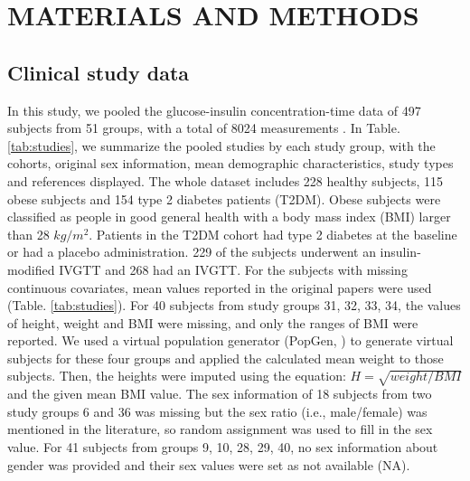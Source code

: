 \documentclass[utf8]{frontiersSCNS} %
\begin{document}
\section{MATERIALS AND METHODS}

\subsection{Clinical study data}
In this study, we pooled the glucose-insulin concentration-time data of 497 subjects from 51 groups, with a total of 8024 measurements . In Table. \ref{tab:studies}, we summarize the pooled studies by each study group, with the cohorts, original sex information, mean demographic characteristics, study types and references displayed. The whole dataset includes 228 healthy subjects, 115 obese subjects and 154 type 2 diabetes patients (T2DM). Obese subjects were classified as people in good general health with a body mass index (BMI) larger than 28 $kg/m^2$. Patients in the T2DM cohort had type 2 diabetes at the baseline or had a placebo administration. 229 of the subjects underwent an insulin-modified IVGTT and 268 had an IVGTT. For the subjects with missing continuous covariates, mean values reported in the original papers were used (Table. \ref{tab:studies}). For 40 subjects from study groups 31, 32, 33, 34, the values of height, weight and BMI were missing, and only the ranges of BMI were reported. We used a virtual population generator (PopGen, \cite{McNally2015}) to generate virtual subjects for these four groups and applied the calculated mean weight to those subjects. Then, the heights were imputed using the equation: $H=\sqrt{weight/BMI}$ and the given mean BMI value. The sex information of 18 subjects from two study groups 6 and 36 was missing but the sex ratio (i.e., male/female) was mentioned in the literature, so random assignment was used to fill in the sex value. For 41 subjects from groups 9, 10, 28, 29, 40, no sex information about gender was provided and their sex values were set as not available (NA). 
\end{document}
